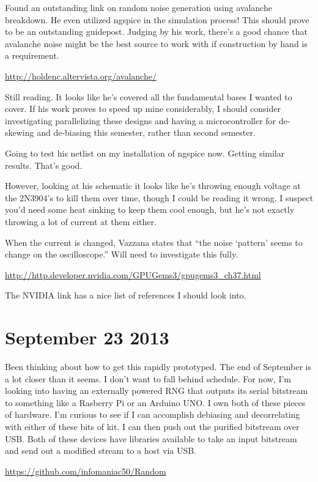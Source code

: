 \documentclass[journal]{IEEEtran}
\begin{document}
Found an outstanding link on random noise generation using avalanche 
breakdown. He even utilized ngspice in the simulation process! This should 
prove to be an outstanding guidepost. Judging by his work, there's a good 
chance that avalanche noise might be the best source to work with if 
construction by hand is a requirement.

\url{http://holdenc.altervista.org/avalanche/}

Still reading. It looks like he's covered all the fundamental bases I wanted 
to cover. If his work proves to speed up mine considerably, I should 
consider investigating parallelizing these designs and having a 
microcontroller for de-skewing and de-biasing this semester, rather than 
second semester.

Going to test his netlist on my installation of ngspice now. Getting similar 
results. That's good.

However, looking at his schematic it looks like he's throwing enough voltage 
at the 2N3904's to kill them over time, though I could be reading it wrong. I 
suspect you'd need some heat sinking to keep them cool enough, but he's not 
exactly throwing a lot of current at them either. 

When the current is changed, Vazzana states that ``the noise `pattern' seems to
change on the oscilloscope.'' Will need to investigate this fully.

\url{http://http.developer.nvidia.com/GPUGems3/gpugems3_ch37.html}

The NVIDIA link has a nice list of references I should look into.

\section{September 23 2013}

Been thinking about how to get this rapidly prototyped. The end of September 
is a lot closer than it seems. I don't want to fall behind schedule. For 
now, I'm looking into having an externally powered RNG that outputs its serial 
bitstream to something like a Rasberry Pi or an Arduino UNO. I own both of 
these pieces of hardware. I'm curious to see if I can accomplish debiasing 
and decorrelating with either of these bits of kit. I can then push out the 
purified bitstream over USB. Both of these devices have libraries available to 
take an input bitstream and send out a modified stream to a host via USB.

\url{https://github.com/infomaniac50/Random}
\end{document}
